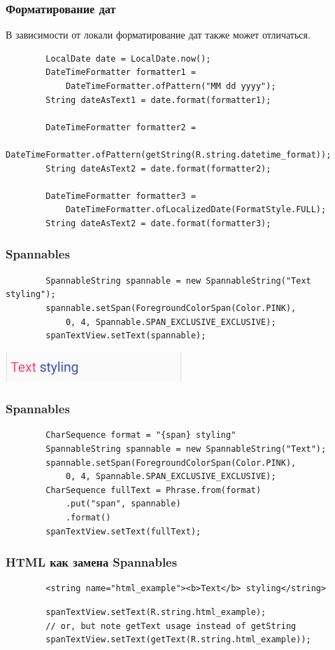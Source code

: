 \documentclass{beamer}
\begin{document}
\begin{frame}[fragile]
    \frametitle{Форматирование дат}
    В зависимости от локали форматирование дат также может отличаться.
    \begin{verbatim}
        LocalDate date = LocalDate.now();
        DateTimeFormatter formatter1 =
            DateTimeFormatter.ofPattern("MM dd yyyy");
        String dateAsText1 = date.format(formatter1);

        DateTimeFormatter formatter2 =
            DateTimeFormatter.ofPattern(getString(R.string.datetime_format));
        String dateAsText2 = date.format(formatter2);

        DateTimeFormatter formatter3 =
            DateTimeFormatter.ofLocalizedDate(FormatStyle.FULL);
        String dateAsText2 = date.format(formatter3);
    \end{verbatim}
\end{frame}

\begin{frame}[fragile]
    \frametitle{Spannables}
    \begin{verbatim}
        SpannableString spannable = new SpannableString("Text styling");
        spannable.setSpan(ForegroundColorSpan(Color.PINK),
            0, 4, Spannable.SPAN_EXCLUSIVE_EXCLUSIVE);
        spanTextView.setText(spannable);
    \end{verbatim}
    \begin{center}
        \includegraphics[width=0.5\textwidth,keepaspectratio]{images/span}
    \end{center}
\end{frame}

\begin{frame}[fragile]
    \frametitle{Spannables}
    \begin{verbatim}
        CharSequence format = "{span} styling"
        SpannableString spannable = new SpannableString("Text");
        spannable.setSpan(ForegroundColorSpan(Color.PINK),
            0, 4, Spannable.SPAN_EXCLUSIVE_EXCLUSIVE);
        CharSequence fullText = Phrase.from(format)
            .put("span", spannable)
            .format()
        spanTextView.setText(fullText);
    \end{verbatim}
\end{frame}
\begin{frame}[fragile]
    \frametitle{HTML как замена Spannables}
    \begin{verbatim}
        <string name="html_example"><b>Text</b> styling</string>
    \end{verbatim}
    \begin{verbatim}
        spanTextView.setText(R.string.html_example);
        // or, but note getText usage instead of getString
        spanTextView.setText(getText(R.string.html_example));
    \end{verbatim}
\end{frame}
\end{document}
